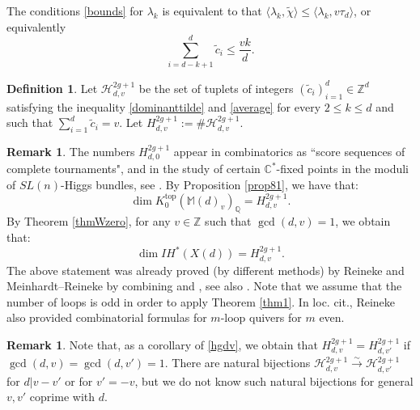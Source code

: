 \documentclass [11pt,oneside,a4paper,mathscr]{amsart}
\theoremstyle{definition}
\newtheorem{defn}[thm]{Definition}
\newtheorem{remark}[thm]{Remark}
\renewcommand{\leq}{\leqslant}
\begin{document}
The conditions \eqref{bounds} for $\lambda_k$ 
is equivalent to 
that $\langle \lambda_k, \widetilde{\chi}\rangle\leq \langle \lambda_k, v\tau_d\rangle$, or 
equivalently 
\begin{equation}\label{average}
    \sum_{i=d-k+1}^d\widetilde{c}_i\leq \frac{vk}{d}.
\end{equation}

\begin{defn}\label{def86}
Let $\mathscr{H}^{2g+1}_{d,v}$ be the set of tuplets of integers $(\widetilde{c}_i)_{i=1}^d\in \mathbb{Z}^d$ satisfying the inequality \eqref{dominanttilde} and \eqref{average} for every $2\leq k\leq d$ and such that $\sum_{i=1}^d \widetilde{c}_i=v$. 
Let $H^{2g+1}_{d,v}:=\# \mathscr{H}^{2g+1}_{d,v}$.
\end{defn}

\begin{remark}
The numbers $H^{2g+1}_{d,0}$ appear in combinatorics as ``score sequences of complete tournaments", and in the study of certain $\mathbb{C}^*$-fixed points in the moduli of $SL(n)$-Higgs bundles, see \cite[Section 7]{MR2889742}. By Proposition \ref{prop81}, we have that:
\[\dim K^{\mathrm{top}}_0(\mathbb{M}(d)_v)_{\mathbb{Q}}=H^{2g+1}_{d,v}.\]
By Theorem \ref{thmWzero}, for any $v\in\mathbb{Z}$ such that $\gcd(d,v)=1$, we obtain that:
\begin{equation}\label{hgdv}
\dim I\!H^{\ast}(X(d))=H^{2g+1}_{d,v}.
\end{equation}
The above statement was already proved (by different methods) by Reineke and Meinhardt--Reineke by combining \cite[Theorem 7.1]{MR2889742} and \cite[Theorem 4.6]{MeRe}, see also \cite[Section 4.3]{MeRe}. Note that we assume that the number of loops is odd in order to apply Theorem \ref{thm1}. In loc. cit., Reineke also provided combinatorial formulas for $m$-loop quivers for $m$ even.
\end{remark}

\begin{remark}
    Note that, as a corollary of \eqref{hgdv}, we obtain that $H^{2g+1}_{d,v}=H^{2g+1}_{d,v'}$ if $\gcd(d,v)=\gcd(d,v')=1$. There are natural bijections $\mathscr{H}^{2g+1}_{d,v}\xrightarrow{\sim} \mathscr{H}^{2g+1}_{d,v'}$ for $d|v-v'$ or for $v'=-v$, but we do not know such natural bijections for general $v,v'$ coprime with $d$.
\end{remark}
\end{document}
